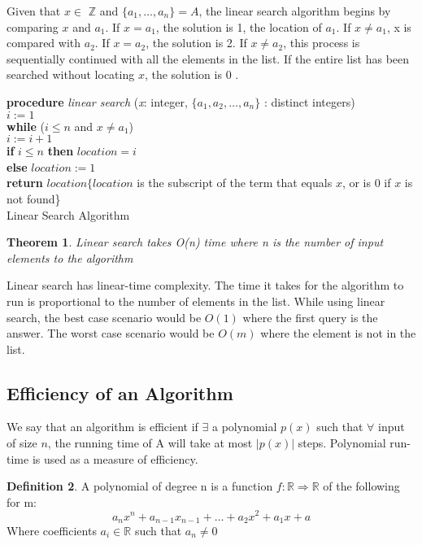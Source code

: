 \documentclass[11pt]{article}
\theoremstyle{plain}
\newtheorem{thm}{Theorem}
\theoremstyle{definition}
\newtheorem{defn}[thm]{Definition}
\begin{document}
Given that $x\in $ $\mathbb{Z}$ and $\{a_1,\ldots,a_n \}=A$, the linear search algorithm begins by comparing $x$ and $a_1$. If $x = a_1$, the solution is 1, the location of $a_1$. If $x\neq a_1$, x is compared with $a_2$. If $x = a_2$, the solution is 2. If $x\neq a_2$, this process is sequentially continued with all the elements in the list. If the entire list has been searched without locating $x$, the solution is 0 \cite{rosen:1}. 
\bigbreak
\begin{algorithm}[H] 
\SetAlgoLined
\textbf{procedure} \textit{linear search }(\textit{x}: integer, $\{a_1,a_2,\ldots,a_n \}$ : distinct integers)\\
$i := 1$ \\
\textbf{while} ($i \le n$ and $x\neq a_1$)\\
\setlength{\parindent}{15pt}$i := i+1$ \\
\setlength{\parindent}{0pt}\textbf{if} $i \le n$ \textbf{then} $location = i$\\
\textbf{else} $location:=1$\\
\textbf{return} $location \{ location $ is the subscript of the term that equals $x$, or is 0 if $x$ is not found\}\\
\caption{Linear Search Algorithm \cite{rosen:1}}
\end{algorithm}
\begin{thm}
Linear search takes O(n) time where n is the number of input elements to the algorithm
\end{thm}
Linear search has linear-time complexity. The time it takes for the algorithm to run is proportional to the number of elements in the list. While using linear search, the best case scenario would be $O(1)$ where the first query is the answer.  The worst case scenario would be $O(m)$ where the element is not in the list.
\subsection*{Efficiency of an Algorithm } 
We say that an algorithm is efficient if $\exists$ a polynomial $p(x)$ such that $\forall$ input of size $n$, the running time of A will take at most $|p(x)|$ steps.
 \setlength{\parindent}{0pt}\bigbreak
Polynomial run-time is used as a measure of efficiency. 

\begin{defn}
A polynomial of degree n is a function $f:\mathbb{R} \Rightarrow \mathbb{R}$ of the following for m:
$$a_nx^n+a_{n-1}x_{n-1}+ \ldots +a_2x^2+a_1x+a$$
Where coefficients $a_i\in \mathbb{R}$ such that $a_n \neq 0$
\end{defn}
\end{document}
